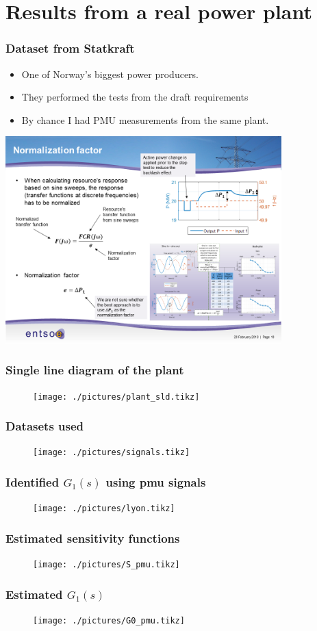 \section{Results from a real power plant}
\begin{frame}
	\frametitle{Dataset from Statkraft}
	\begin{itemize}[<+->]
		\item One of Norway's biggest power producers.
		\item They performed the tests from the draft requirements
		\item By chance I had PMU measurements from the same plant.
		\end{itemize}
		\includegraphics[width=0.8\textwidth]{./pictures/fcr.png}
\end{frame}
\begin{frame}
	\frametitle{Single line diagram of the plant}
	\begin{figure}
			\texttt{[image: ./pictures/plant\_sld.tikz]}
	\end{figure}
\end{frame}
\begin{frame}
	\frametitle{Datasets used}
	\begin{figure}
			\texttt{[image: ./pictures/signals.tikz]}
	\end{figure}
\end{frame}
\begin{frame}
		\frametitle{Identified $G_1(s)$ using pmu signals}
	\begin{figure}
			\texttt{[image: ./pictures/lyon.tikz]}
	\end{figure}
\end{frame}
\begin{frame}
	\frametitle{Estimated sensitivity functions}
		\begin{figure}[tb]
			\texttt{[image: ./pictures/S\_pmu.tikz]}
		\end{figure}
\end{frame}
\begin{frame}
	\frametitle{Estimated $G_1(s)$}
		\begin{figure}[tb]
			\texttt{[image: ./pictures/G0\_pmu.tikz]}
		\end{figure}
\end{frame}

